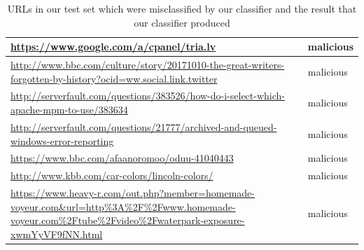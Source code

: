 \documentclass[12pt,twoside]{report}
\begin{document}
\begin{spacing}{1}
\begin{center}
\begin{longtable}{ |>{\raggedright\arraybackslash}p{}|>{\raggedright\arraybackslash}p{}| }
\hline
\url{https://www.google.com/a/cpanel/tria.lv} & malicious
\\
\hline
\url{http://www.bbc.com/culture/story/20171010-the-great-writers-forgotten-by-history?ocid=ww.social.link.twitter} & malicious
\\
\hline
\url{http://serverfault.com/questions/383526/how-do-i-select-which-apache-mpm-to-use/383634} & malicious
\\
\hline
\url{http://serverfault.com/questions/21777/archived-and-queued-windows-error-reporting} & malicious
\\
\hline
\url{https://www.bbc.com/afaanoromoo/oduu-41040443} & malicious
\\
\hline
\url{http://www.kbb.com/car-colors/lincoln-colors/} & malicious
\\
\hline
\url{https://www.heavy-r.com/out.php?member=homemade-voyeur.com&url=http\%3A\%2F\%2Fwww.homemade-voyeur.com\%2Ftube\%2Fvideo\%2Fwaterpark-exposure-xwmYyVF9fNN.html} & malicious
\hline
\caption{URLs in our test set which were misclassified by our classifier and the result that our classifier produced}
\end{longtable}
\end{center}

\end{spacing}
\end{document}
